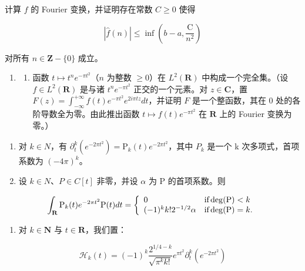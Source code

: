 计算 \(f\) 的 Fourier 变换，并证明存在常数 \(C \geqslant 0\) 使得

\[
| \widehat {f} (n) | \leqslant \inf \left(b - a, \frac {\mathrm{C}}{n ^ {2}}\right)
\]

对所有 \(n \in \mathbf{Z} - \{0\}\) 成立。

\begin{enumerate}
\def\labelenumi{\arabic{enumi})}
\setcounter{enumi}{2}
\tightlist
\item
  \begin{enumerate}
  \def\labelenumii{\alph{enumii})}
  \tightlist
  \item
    函数 \(t \mapsto t^n e^{-\pi t^2}\)（\(n\) 为整数 \(\geqslant 0\)）在 \(L^2(\mathbf{R})\) 中构成一个完全集。（设 \(f \in L^2(\mathbf{R})\) 是与诸 \(t^n e^{-\pi t^2}\) 正交的一个元素。对 \(z \in \mathbf{C}\)，置 \(F(z) = \int_{-\infty}^{+\infty} f(t)e^{-\pi t^2}e^{2i\pi tz}dt\)，并证明 \(F\) 是一个整函数，其在 0 处的各阶导数全为零。由此推出函数 \(t \mapsto f(t)e^{-\pi t^2}\) 在 \(\mathbf{R}\) 上的 Fourier 变换为零。）
  \end{enumerate}
\end{enumerate}

\begin{enumerate}
\def\labelenumi{\alph{enumi})}
\setcounter{enumi}{1}
\item
  对 \(k \in N\)，有 \(\partial_{t}^{k}(e^{-2\pi t^{2}}) = \mathrm{P}_{k}(t)e^{-2\pi t^{2}}\)，其中 \(P_{k}\) 是一个 k 次多项式，首项系数为 \((-4\pi)^{k}\)。
\item
  设 \(k \in N\)、\(P \in C[t]\) 非零，并设 \(\alpha\) 为 P 的首项系数。则
\end{enumerate}

\[
\int_ {\mathbf {R}} \mathrm{P} _ {k} (t) e ^ {- 2 \pi t ^ {2}} \mathrm{P} (t)   d t = \left\{ \begin{array}{l l} 0 & \text {if} \deg (\mathrm{P}) <   k \\ (- 1) ^ {k} k! 2 ^ {- 1 / 2} \alpha & \text {if} \deg (\mathrm{P}) = k. \end{array} \right.
\]

\begin{enumerate}
\def\labelenumi{\alph{enumi})}
\setcounter{enumi}{3}
\tightlist
\item
  对 \(k \in \mathbf{N}\) 与 \(t \in \mathbf{R}\)，我们置：
\end{enumerate}

\[
\mathcal {H} _ {k} (t) = (- 1) ^ {k} \frac {2 ^ {1 / 4 - k}}{\sqrt {\pi^ {k} k !}} e ^ {\pi t ^ {2}} \partial_ {t} ^ {k} (e ^ {- 2 \pi t ^ {2}})
\]

